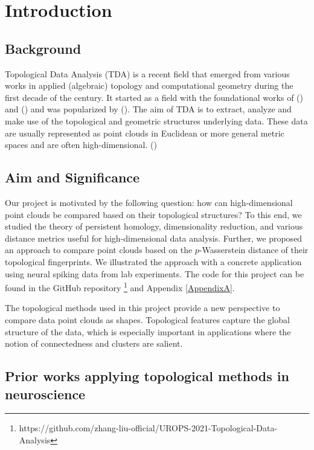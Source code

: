 \chapter{Introduction} 
\label{Chapter1-intro} 

\section{Background}
Topological Data Analysis (TDA) is a recent field that emerged from various works in applied (algebraic) topology and computational geometry during the first decade of the century. It started as a field with the foundational works of (\cite{edelsbrunner_topological_2002}) and (\cite{Zom2005a}) and was popularized by (\cite{carlsson_topology_2009}). The aim of TDA is to extract, analyze and make use of the topological and geometric structures underlying data. These data are usually represented as point clouds in Euclidean or more general metric spaces and are often high-dimensional. (\cite{chazal_introduction_2021})

\section{Aim and Significance}
Our project is motivated by the following question: how can high-dimensional point clouds be compared based on their topological structures? To this end, we studied the theory of persistent homology, dimensionality reduction, and various distance metrics useful for high-dimensional data analysis. Further, we proposed an approach to compare point clouds based on the $p$-Wasserstein distance of their topological fingerprints. We illustrated the approach with a concrete application using neural spiking data from lab experiments. The code for this project can be found in the GitHub repository \footnote{https://github.com/zhang-liu-official/UROPS-2021-Topological-Data-Analysis} and Appendix \ref{AppendixA}.

The topological methods used in this project provide a new perspective to compare data point clouds as shapes. Topological features capture the global structure of the data, which is especially important in applications where the notion of connectedness and clusters are salient.


\section{Prior works applying topological methods in neuroscience}

